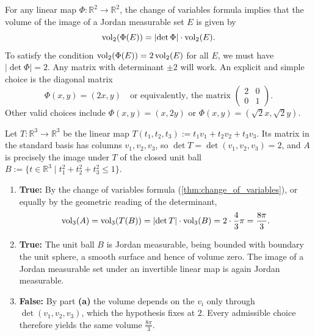 \begin{exercisesolution}
\label{sol:linear_map_volume_scaling_box}
For any linear map $\Phi \colon \mathbb{R}^2 \to \mathbb{R}^2$, the change of variables formula
implies that the volume of the image of a Jordan measurable set $E$ is given by
\[ \operatorname{vol}_2(\Phi(E)) = \lvert\det \Phi\rvert \cdot \operatorname{vol}_2(E). \]
To satisfy the condition $\operatorname{vol}_2(\Phi(E)) = 2 \operatorname{vol}_2(E)$ for all $E$, we must have
$\lvert\det \Phi\rvert = 2$. Any matrix with determinant $\pm 2$ will work. An explicit and simple
choice is the diagonal matrix
\[ \Phi(x,y) = (2x, y) \quad \text{or equivalently, the matrix } \begin{pmatrix} 2 & 0 \\ 0 & 1 \end{pmatrix}. \]
Other valid choices include $\Phi(x,y) = (x, 2y)$ or $\Phi(x,y) = (\sqrt{2}x, \sqrt{2}y)$.
\end{exercisesolution}

\begin{exercisesolution}
\label{sol:ai_spanned_ellipsoid_volume}
Let $T \colon \mathbb{R}^3 \to \mathbb{R}^3$ be the linear map $T(t_1, t_2, t_3) := t_1 v_1 +
t_2 v_2 + t_3 v_3$. Its matrix in the standard basis has columns $v_1, v_2, v_3$, so
$\det T = \det(v_1, v_2, v_3) = 2$, and $A$ is precisely the image under $T$ of the closed unit ball
$B := \{ t \in \mathbb{R}^3 \mid t_1^2 + t_2^2 + t_3^2 \le 1 \}$.
\begin{enumerate}[label=\textbf{(\alph*)}]
  \item \textbf{True:} By the change of variables formula (\cref{thm:change_of_variables}), or
    equally by the geometric reading of the determinant,
    \[ \operatorname{vol}_3(A) = \operatorname{vol}_3(T(B)) = \lvert\det T\rvert \cdot \operatorname{vol}_3(B)
      = 2 \cdot \frac{4}{3}\pi = \frac{8\pi}{3}. \]
  \item \textbf{True:} The unit ball $B$ is Jordan measurable, being bounded with boundary the unit
    sphere, a smooth surface and hence of volume zero. The image of a Jordan measurable set under
    an invertible linear map is again Jordan measurable.
  \item \textbf{False:} By part \textbf{(a)} the volume depends on the $v_i$ only through
    $\det(v_1,v_2,v_3)$, which the hypothesis fixes at $2$. Every admissible choice therefore
    yields the same volume $\frac{8\pi}{3}$.
\end{enumerate}
\end{exercisesolution}

